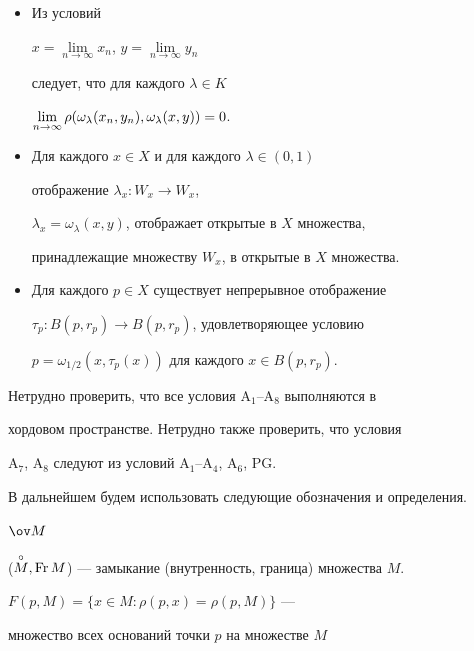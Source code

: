 \begin{itemize} 


\item[A${}_6$.] Из условий 


$x=\lim\limits_{n\to\infty}x_n$, $y=\lim\limits_{n\to\infty}y_n$ 


следует, что для каждого $\lambda\in K$\; 


$\lim\limits_{n\to\infty}\rho(\omega_\lambda(x_n,y_n),\linebreak


\omega_\lambda(x,y))=0$. 


\item[A${}_7$.] Для каждого $x\in X$ и для каждого $\lambda\in(0,1)$ 


отображение $\lambda_x:W_x\to W_x$, 


$\lambda_x=\omega_\lambda(x,y)$, отображает открытые в $X$ множества, 


принадлежащие множеству $W_x$, в открытые в $X$ множества. 


\item[A${}_8$.] Для каждого $p\in X$ существует непрерывное отображение 


$\tau_p:B(p,r_p)\to B(p,r_p)$, удовлетворяющее условию 


$p=\omega_{1/2}(x,\tau_p(x))$ для каждого $x\in B(p,r_p)$. 


\end{itemize} 


 


\begin{notenonum} 


Нетрудно проверить, что все условия A${}_1$--A${}_8$ выполняются в 


хордовом пространстве. Нетрудно также проверить, что условия 


A${}_7$, A${}_8$ следуют из условий A${}_1$--A${}_4$, A${}_6$, PG. 


\end{notenonum} 


 


В дальнейшем будем использовать следующие обозначения и определения.\;


$\ov M$ 


($\overset{\circ}{M}{},\operatorname{Fr} M$) --- замыкание (внутренность, граница) множества $M$.\; 


$F(p,M)=\{x\in M:\rho(p,x)=\rho(p,M)\}$ --- 


множество всех оснований точки $p$ на множестве $M$ 



